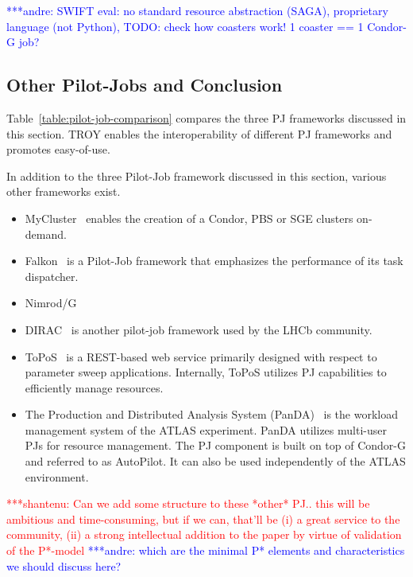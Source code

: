 \documentclass[conference,final]{IEEEtran}
\newcommand{\jhanote}[1]{ {\textcolor{red} { ***shantenu: #1 }}}
\newcommand{\alnote}[1]{ {\textcolor{blue} { ***andre: #1 }}}
\newcommand{\alnote}[1]{}
\newcommand{\jhanote}[1]{}
\begin{document}
\alnote{SWIFT eval: no standard resource abstraction (SAGA), proprietary 
language (not Python), TODO: check how coasters work! 1 coaster == 1 Condor-G 
job?}


\subsection{Other Pilot-Jobs and Conclusion}

Table~\ref{table:pilot-job-comparison} compares the three PJ frameworks
discussed in this section. TROY enables the interoperability of different PJ
frameworks and promotes easy-of-use.


In addition to the three Pilot-Job framework discussed in this section, various
other frameworks exist.
\begin{itemize}
    \item MyCluster~\cite{1652061} enables the 
	creation of a Condor, PBS or SGE clusters on-demand.
    \item Falkon~\cite{1362680} is a Pilot-Job framework that emphasizes the 
	performance of its task dispatcher.
    \item Nimrod/G~\cite{10.1109/HPC.2000.846563}
    \item DIRAC~\cite{1742-6596-219-6-062049} is another pilot-job framework 
	used by the LHCb community.
    \item ToPoS~\cite{topos} is a REST-based web service primarily designed with 
	respect to parameter sweep applications. Internally, ToPoS utilizes PJ 
	capabilities to efficiently manage resources.
    \item The Production and Distributed Analysis System 
	(PanDA)~\cite{1742-6596-219-6-062041} is the workload management system of 
	the ATLAS experiment. PanDA utilizes multi-user PJs for resource management. 
	The PJ component is built on top of Condor-G and referred to as AutoPilot. 
	It can also be used independently of the ATLAS environment. 	
\end{itemize}


\jhanote{Can we add some structure to these *other* PJ.. this will be
  ambitious and time-consuming, but if we can, that'll be (i) a great
  service to the community, (ii) a strong intellectual addition to the
  paper by virtue of validation of the P*-model} \alnote{which are the minimal P* elements and characteristics we should discuss here?}
\end{document}
